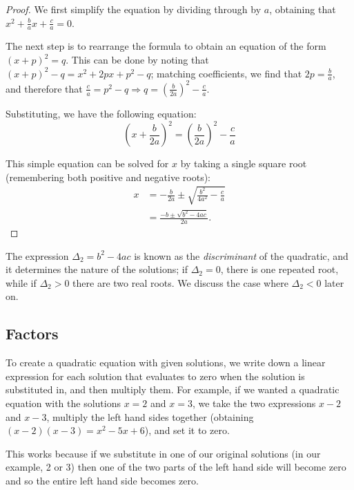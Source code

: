 \documentclass[a4paper,10pt,titlepage]{article}
\theoremstyle{definition}
\begin{document}
\begin{proof}
  We first simplify the equation by dividing through by $ a $, obtaining
  that $ x^2 + \frac{b}{a} x + \frac{c}{a} = 0 $.

  The next step is to rearrange the formula to obtain an equation of the form $ (x + p)^2 = q $.
  This can be done by noting that $ (x + p)^2 - q = x^2 + 2px + p^2 - q $; matching coefficients,
  we find that $ 2p = \frac{b}{a} $, and therefore that $ \frac{c}{a} = p^2 - q \Rightarrow q = (\frac{b}{2a})^2 - \frac{c}{a} $.

  Substituting, we have the following equation:
  \begin{displaymath}
    \left(x + \frac{b}{2a}\right)^2 = \left(\frac{b}{2a}\right)^2 - \frac{c}{a}
  \end{displaymath}

  This simple equation can be solved for $ x $ by taking a single square root (remembering
  both positive and negative roots):
  \begin{align*}
    x &= -\frac{b}{2a} \pm \sqrt{\frac{b^2}{4a^2} - \frac{c}{a}} \\
      &= \frac{-b \pm \sqrt{b^2 - 4ac}}{2a}.
  \end{align*}
\end{proof}

The expression $ \Delta_2 = b^2 - 4ac $ is known as the \textit{discriminant} of the
quadratic, and it determines the nature of the solutions; if $ \Delta_2 = 0 $, there is
one repeated root, while if $ \Delta_2 > 0 $ there are two real roots. We discuss the case
where $ \Delta_2 < 0 $ later on.

\subsection*{Factors}
To create a quadratic equation with given solutions, we write down a linear expression
for each solution that evaluates to zero when the solution is substituted in, and then multiply
them. For example, if we wanted a quadratic equation with the solutions $ x = 2 $ and $ x = 3 $,
we take the two expressions $ x - 2 $ and $ x - 3 $, multiply the left hand sides together
(obtaining $ (x-2)(x-3) = x^2 - 5x + 6 $), and set it to zero.

This works because if we substitute in one of our original solutions (in our
example, 2 or 3) then one of the two parts of the left hand side will become zero
and so the entire left hand side becomes zero.
\end{document}
